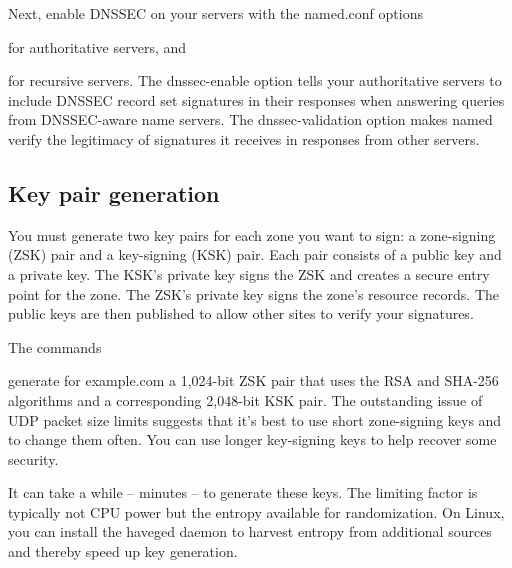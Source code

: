 Next, enable DNSSEC on your servers with the {named.conf} options


for authoritative servers, and


for recursive servers. The {dnssec-enable} option tells your
authoritative servers to include DNSSEC record set signatures in their
responses when answering queries from DNSSEC-aware name servers. The
{dnssec-validation} option makes {named} verify the legitimacy of
signatures it receives in responses from other servers.

\protect\hypertarget{part0024_split_063.html}{}{}

\hypertarget{part0024_split_063.htmlux5cux23_idContainer1069}{}
\hypertarget{part0024_split_063.htmlux5cux23calibre_pb_62}{%
\subsection[Key pair
generation]{\texorpdfstring{\protect\hypertarget{part0024_split_063.htmlux5cux23_idTextAnchor942}{}{}Key
pair
generation}{Key pair generation}}\label{part0024_split_063.htmlux5cux23calibre_pb_62}}

You must generate two key pairs for each zone you want to sign: a
zone-signing (ZSK) pair and a key-signing (KSK) pair. Each pair consists
of a public key and a private key. The KSK's private key signs the ZSK
and creates a secure entry point for the zone. The ZSK's private key
signs the zone's resource records. The public keys are then published to
allow other sites to verify your signatures.

The commands


\protect\hypertarget{part0024_split_063.htmlux5cux23_idIndexMarker2262}{}{}\protect\hypertarget{part0024_split_063.htmlux5cux23_idIndexMarker2263}{}{}generate
for example.com a 1,024-bit ZSK pair that uses the RSA and SHA-256
algorithms and a corresponding 2,048-bit KSK pair. The outstanding issue
of UDP packet size limits suggests that it's best to use short
zone-signing keys and to change them often. You can use longer
key-signing keys to help recover some security.

It can take a while -- minutes -- to generate these keys. The limiting
factor is typically not CPU power but the entropy available for
randomization. On Linux, you can install the {haveged} daemon to harvest
entropy from additional sources and thereby speed up key generation.

